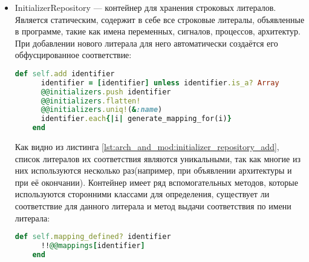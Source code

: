   \begin{itemize}
  \item InitializerRepository --- контейнер для хранения строковых литералов. Является статическим, содержит в себе все строковые литералы, объявленные в программе, такие как имена переменных, сигналов, процессов, архитектур. При добавлении нового литерала для него автоматически создаётся его обфусцированное соответствие:
  \begin{lstlisting}[language=Ruby, style=rubystyle,caption={Определение метода перевода класса в строку для примитива component instantiation}, label=lst:arch_and_mod:initializer_repository_add]
    def self.add identifier
      identifier = [identifier] unless identifier.is_a? Array
      @@initializers.push identifier
      @@initializers.flatten!
      @@initializers.uniq!(&:name)
      identifier.each{|i| generate_mapping_for(i)}
    end
  \end{lstlisting}


  Как видно из листинга \ref{lst:arch_and_mod:initializer_repository_add}, список литералов их соответствия являются уникальными, так как многие из них используются несколько раз(например, при объявлении архитектуры и при её окончании).
  Контейнер имеет ряд вспомогательных методов, которые используются сторонними классами для определения, существует ли соответствие для данного литерала и метод выдачи соответствия по имени литерала:


  \begin{lstlisting}[language=Ruby, style=rubystyle,caption={Вспомогательные методы контейнера}, label=lst:arch_and_mod:support_methods]
    def self.mapping_defined? identifier
      !!@@mappings[identifier]
    end


\end{lstlisting}
\end{itemize}
